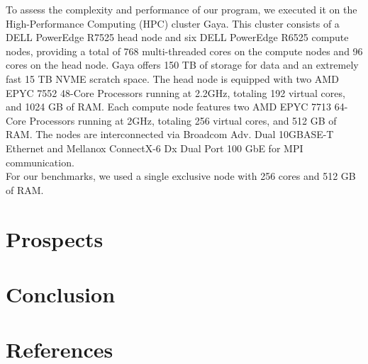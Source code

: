 \documentclass[12pt]{article}
\begin{document}
To assess the complexity and performance of our program, we executed it on
the High-Performance Computing (HPC) cluster Gaya. This cluster consists of a
DELL PowerEdge R7525 head node and six DELL PowerEdge R6525 compute nodes,
providing a total of 768 multi-threaded cores on the compute nodes and 96 cores
on the head node. Gaya offers 150 TB of storage for data and an extremely fast
15 TB NVME scratch space. The head node is equipped with two AMD EPYC 7552
48-Core Processors running at 2.2GHz, totaling 192 virtual cores, and 1024
GB of RAM. Each compute node features two AMD EPYC 7713 64-Core Processors
running at 2GHz, totaling 256 virtual cores, and 512 GB of RAM.
The nodes are interconnected via Broadcom Adv. Dual 10GBASE-T Ethernet and
Mellanox ConnectX-6 Dx Dual Port 100 GbE for MPI communication.\\
For our benchmarks, we used a single exclusive node with 256 cores and 512 GB
of RAM.


\section{Prospects}


\section{Conclusion}

\newpage

\section{References}


\end{document}
